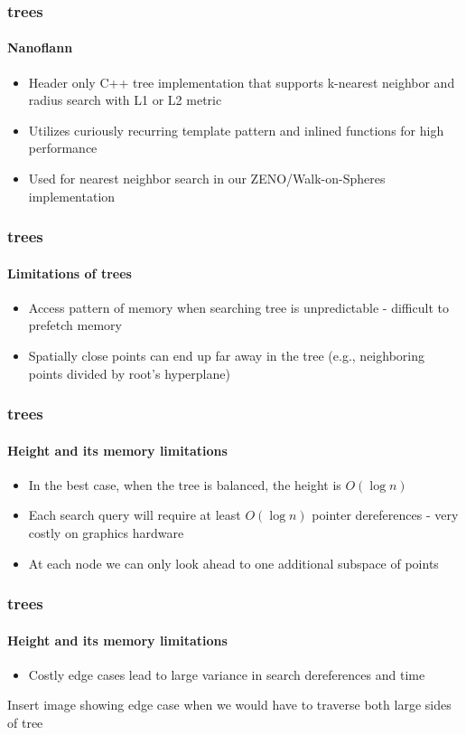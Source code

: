 \begin{frame}
  \frametitle{\kd trees}
  \framesubtitle{Nanoflann}

  \begin{itemize}
    \item Header only C++ \kd tree implementation that supports k-nearest neighbor and radius search with 
      L1 or L2 metric
    \item Utilizes curiously recurring template pattern and inlined functions for high performance
    \item Used for nearest neighbor search in our ZENO/Walk-on-Spheres implementation 
  \end{itemize}

\end{frame}


\begin{frame}
  \frametitle{\kd trees}
  \framesubtitle{Limitations of trees}

  \begin{itemize}
    \item Access pattern of memory when searching tree is unpredictable - difficult to prefetch memory
    \item Spatially close points can end up far away in the tree (e.g., neighboring points divided by 
      root's hyperplane)
  \end{itemize}
\end{frame}

\begin{frame}
  \frametitle{\kd trees}
  \framesubtitle{Height and its memory limitations}

  \begin{itemize}
    \item In the best case, when the tree is balanced, the height is $O(\log n)$
    \item Each search query will require at least $O(\log n )$ pointer dereferences - very costly on graphics 
      hardware
    \item At each node we can only look ahead to one additional subspace of points
  \end{itemize}
\end{frame}

\begin{frame}
  \frametitle{\kd trees}
  \framesubtitle{Height and its memory limitations}

  \begin{itemize}
    \item Costly edge cases lead to large variance in search dereferences and time
  \end{itemize}

  Insert image showing edge case when we would have to traverse both large sides of tree
\end{frame}
